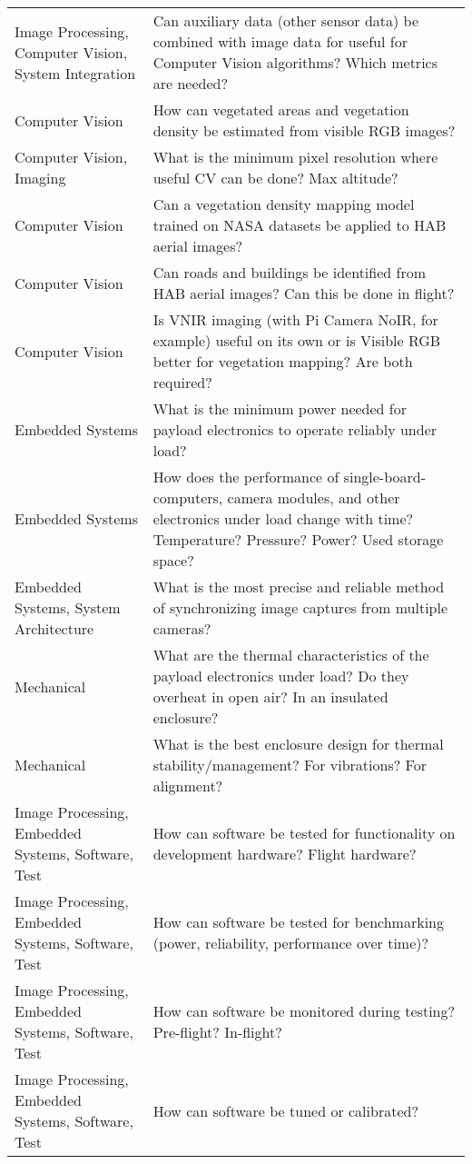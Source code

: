 \documentclass[conference]{IEEEtran} %
\begin{document}
\begin{table}[h!]
\begin{tabularx}{\linewidth}{@{}p{}X@{}}
    Image Processing, Computer Vision, System Integration & Can auxiliary data (other sensor data) be combined with image data for useful for Computer Vision algorithms? Which metrics are needed? \\
    Computer Vision & How can vegetated areas and vegetation density be estimated from visible RGB images? \\
    Computer Vision, Imaging & What is the minimum pixel resolution where useful CV can be done? Max altitude? \\
    Computer Vision & Can a vegetation density mapping model trained on NASA datasets be applied to HAB aerial images? \\
    Computer Vision & Can roads and buildings be identified from HAB aerial images? Can this be done in flight? \\
    Computer Vision & Is VNIR imaging (with Pi Camera NoIR, for example) useful on its own or is Visible RGB better for vegetation mapping? Are both required? \\
    Embedded Systems & What is the minimum power needed for payload electronics to operate reliably under load? \\
    Embedded Systems & How does the performance of single-board-computers, camera modules, and other electronics under load change with time? Temperature? Pressure? Power? Used storage space? \\
    Embedded Systems, System Architecture & What is the most precise and reliable method of synchronizing image captures from multiple cameras? \\
    Mechanical & What are the thermal characteristics of the payload electronics under load? Do they overheat in open air? In an insulated enclosure? \\
    Mechanical & What is the best enclosure design for thermal stability/management? For vibrations? For alignment? \\
    Image Processing, Embedded Systems, Software, Test & How can software be tested for functionality on development hardware? Flight hardware? \\
    Image Processing, Embedded Systems, Software, Test & How can software be tested for benchmarking (power, reliability, performance over time)? \\
    Image Processing, Embedded Systems, Software, Test & How can software be monitored during testing? Pre-flight? In-flight? \\
    Image Processing, Embedded Systems, Software, Test & How can software be tuned or calibrated? \\
\end{tabularx}
\end{table}
\end{document}
